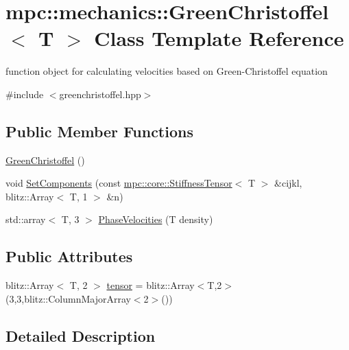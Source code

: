 \hypertarget{structmpc_1_1mechanics_1_1_green_christoffel}{}\section{mpc\+:\+:mechanics\+:\+:Green\+Christoffel$<$ T $>$ Class Template Reference}
\label{structmpc_1_1mechanics_1_1_green_christoffel}


function object for calculating velocities based on Green-\/\+Christoffel equation  




{\ttfamily \#include $<$greenchristoffel.\+hpp$>$}

\subsection*{Public Member Functions}
\begin{DoxyCompactItemize}
\item 
\mbox{\hyperlink{structmpc_1_1mechanics_1_1_green_christoffel_a7a0ced87a84adeda26f1c3e70d6f9214}{Green\+Christoffel}} ()
\item 
void \mbox{\hyperlink{structmpc_1_1mechanics_1_1_green_christoffel_a82e7d064980bd9885e26b25376a23ad4}{Set\+Components}} (const \mbox{\hyperlink{structmpc_1_1core_1_1_stiffness_tensor}{mpc\+::core\+::\+Stiffness\+Tensor}}$<$ T $>$ \&cijkl, blitz\+::\+Array$<$ T, 1 $>$ \&n)
\item 
std\+::array$<$ T, 3 $>$ \mbox{\hyperlink{structmpc_1_1mechanics_1_1_green_christoffel_a84df39c5961390293bf77ba4dfadac13}{Phase\+Velocities}} (T density)
\end{DoxyCompactItemize}
\subsection*{Public Attributes}
\begin{DoxyCompactItemize}
\item 
blitz\+::\+Array$<$ T, 2 $>$ \mbox{\hyperlink{structmpc_1_1mechanics_1_1_green_christoffel_a6d8298d4bd31b188f061c4bd07810c04}{tensor}} = blitz\+::\+Array$<$T,2$>$(3,3,blitz\+::\+Column\+Major\+Array$<$2$>$())
\end{DoxyCompactItemize}


\subsection{Detailed Description}
